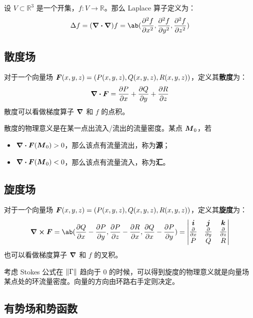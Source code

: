 \begin{definition}[Laplace 算子]
	设 $V \subset \mathbb{R}^{3}$ 是一个开集，$f: V \to \mathbb{R}$。那么 Laplace 算子定义为：
	$$
	\Delta f = (\grad \vdot \grad) f = \ab(\pdv[2]{f}{x}, \pdv[2]{f}{y}, \pdv[2]{f}{z})
	$$
\end{definition}

\subsection{散度场}

\begin{definition}[散度]
	对于一个向量场 $\boldsymbol{F}(x, y, z) = (P(x, y, z), Q(x, y, z), R(x, y, z))$，定义其\textbf{散度}为：
	$$
	\div \boldsymbol{F} = \pdv{P}{x} + \pdv{Q}{y} + \pdv{R}{z}
	$$
	散度可以看做梯度算子 $\grad$ 和 $f$ 的点积。
\end{definition}

散度的物理意义是在某一点出流入/流出的流量密度。某点 $\boldsymbol{M}_0$，若
\begin{itemize}
	\item $\div \boldsymbol{F}(\boldsymbol{M}_0) > 0$，那么该点有流量流出，称为\textbf{源}；
	\item $\div \boldsymbol{F}(\boldsymbol{M}_0) < 0$，那么该点有流量流入，称为\textbf{汇}。
\end{itemize}

\subsection{旋度场}

\begin{theorem}[旋度]
	对于一个向量场 $\boldsymbol{F}(x, y, z) = (P(x, y, z), Q(x, y, z), R(x, y, z))$，定义其\textbf{旋度}为：
	$$
	\curl \vect{F} = \ab(\pdv{Q}{x} - \pdv{P}{y}, \pdv{P}{z} - \pdv{R}{x}, \pdv{Q}{x} - \pdv{P}{y}) = \begin{vmatrix}
		\vect{i} & \vect{j} & \vect{k} \\
		\pdv{x} & \pdv{y} & \pdv{z} \\
		P & Q & R
	\end{vmatrix}
	$$
	也可以看做梯度算子 $\grad$ 和 $f$ 的叉积。
\end{theorem}

考虑 Stokes 公式在 $\norm{\Gamma}$ 趋向于 $0$ 的时候，可以得到旋度的物理意义就是向量场某点处的环流量密度。向量的方向由环路右手定则决定。

\subsection{有势场和势函数}

